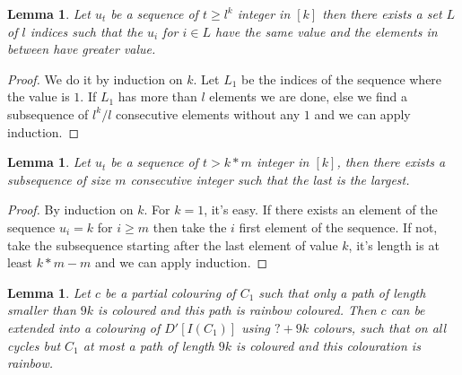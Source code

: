 \documentclass[10pt]{article}
\theoremstyle{plain}
\newtheorem{lemma}[theorem]{Lemma}
\theoremstyle{definition}
\theoremstyle{remark}
\begin{document}
\begin{lemma}\label{min}
Let $u_t$ be a sequence of $t \geq l^k$ integer in $[k]$ then there exists a set $L$ of $l$ indices such that the $u_i$ for $i \in L$ have the same value 
and the elements in between have greater value. 
\end{lemma}

\begin{proof}
We do it by induction on $k$. Let $L_1$ be the indices of the sequence where the value is $1$. If $L_1$ has more than $l$ elements we are done,
else we find a subsequence of $l^k/l$ consecutive elements without any $1$ and we can apply induction. 
\end{proof} 

\begin{lemma}\label{max}
Let $u_t$ be a sequence of $t > k*m$ integer in $[k]$, then there exists a subsequence of size $m$ consecutive integer such that the 
last is the largest.
\end{lemma}

\begin{proof}
By induction on $k$. For $k = 1$, it's easy. 
If there exists an element of the sequence $u_i = k$ for $i \geq m$ then take the $i$ first element of the sequence.
If not, take the subsequence starting after the last element of value $k$, it's length is at least $k*m - m$ and we can apply induction. 
\end{proof}

\begin{lemma}\label{IC}
Let $c$ be a partial colouring of $C_1$ such that only a path of length smaller than
$9k$ is coloured and this path is rainbow coloured. Then $c$ can be extended into
a colouring of $D'[I(C_1)]$ using $? + 9k$ colours, such that on all cycles but $C_1$ at most a path of length $9k$ is
coloured and this colouration is rainbow.
\end{lemma}
\end{document}
